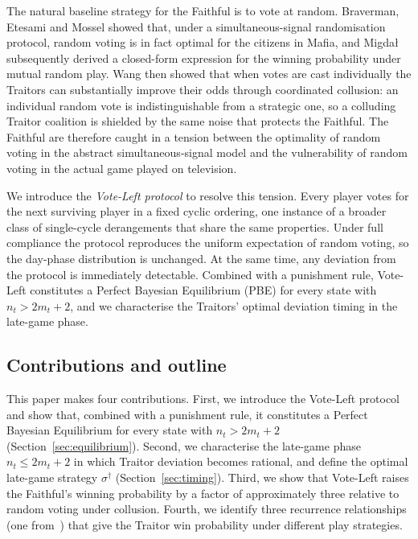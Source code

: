 \documentclass[11pt,a4paper]{article}
\begin{document}
The natural baseline strategy for the Faithful is to vote at random.
Braverman, Etesami and Mossel \cite{braverman2008} showed that, under a
simultaneous-signal randomisation protocol, random voting is in fact
optimal for the citizens in Mafia, and Migda\l{}
\cite{migdal2010} subsequently derived a closed-form expression for the
winning probability under mutual random play. Wang \cite{wang2024} then
showed that when votes are cast individually the Traitors can substantially
improve their odds through coordinated collusion: an individual random
vote is indistinguishable from a strategic one, so a colluding Traitor
coalition is shielded by the same noise that protects the Faithful. The
Faithful are therefore caught in a tension between the optimality of random
voting in the abstract simultaneous-signal model and the vulnerability of
random voting in the actual game played on television.

We introduce the \emph{Vote-Left protocol} to resolve this tension. Every
player votes for the next surviving player in a fixed cyclic ordering, one
instance of a broader class of single-cycle derangements that share the
same properties. Under full compliance the protocol reproduces the uniform
expectation of random voting, so the day-phase distribution is unchanged. At
the same time, any deviation from the protocol is immediately detectable.
Combined with a punishment rule, Vote-Left constitutes a Perfect Bayesian
Equilibrium (PBE) for every state with \(n_t > 2m_t + 2\), and we
characterise the Traitors' optimal deviation timing in the late-game phase.

\subsection*{Contributions and outline}

This paper makes four contributions. First, we introduce the Vote-Left
protocol and show that, combined with a punishment rule, it constitutes a
Perfect Bayesian Equilibrium for every state with \(n_t > 2m_t + 2\)
(Section~\ref{sec:equilibrium}). Second, we characterise the late-game
phase \(n_t \leq 2m_t + 2\) in which Traitor deviation becomes rational,
and define the optimal late-game strategy \(\sigma^\dagger\)
(Section~\ref{sec:timing}). Third, we show that Vote-Left raises the
Faithful's winning probability by a factor of approximately three relative
to random voting under collusion. Fourth, we identify three recurrence
relationships (one from~\cite{migdal2010}) that give the Traitor win probability
under different play strategies.
\end{document}
